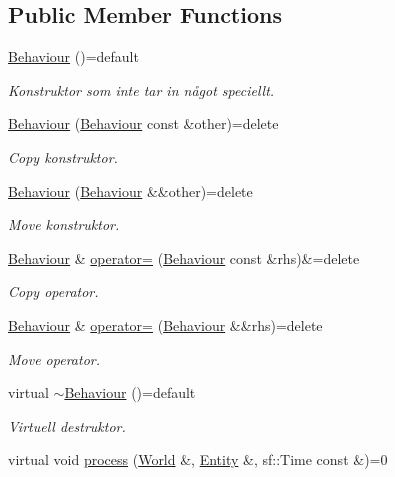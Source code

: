 \subsection*{Public Member Functions}
\begin{DoxyCompactItemize}
\item 
\hyperlink{classBehaviour_a57e050961bc1305993adaeac62658657}{Behaviour} ()=default
\begin{DoxyCompactList}\small\item\em Konstruktor som inte tar in något speciellt. \end{DoxyCompactList}\item 
\hyperlink{classBehaviour_a0a4eeb61f67cc58c720a110ef9695a73}{Behaviour} (\hyperlink{classBehaviour}{Behaviour} const \&other)=delete
\begin{DoxyCompactList}\small\item\em Copy konstruktor. \end{DoxyCompactList}\item 
\hyperlink{classBehaviour_ae157e7d158e19b515eaac6ef3b37ef0a}{Behaviour} (\hyperlink{classBehaviour}{Behaviour} \&\&other)=delete
\begin{DoxyCompactList}\small\item\em Move konstruktor. \end{DoxyCompactList}\item 
\hyperlink{classBehaviour}{Behaviour} \& \hyperlink{classBehaviour_a3c0ca3a4544e6c126ddaf662538b2e48}{operator=} (\hyperlink{classBehaviour}{Behaviour} const \&rhs)\&=delete
\begin{DoxyCompactList}\small\item\em Copy operator. \end{DoxyCompactList}\item 
\hyperlink{classBehaviour}{Behaviour} \& \hyperlink{classBehaviour_a1bfe3e24e2776f887cf67863630e4154}{operator=} (\hyperlink{classBehaviour}{Behaviour} \&\&rhs)=delete
\begin{DoxyCompactList}\small\item\em Move operator. \end{DoxyCompactList}\item 
virtual \hyperlink{classBehaviour_a3c695554c881998c9ef87cb407b4e451}{$\sim$\+Behaviour} ()=default
\begin{DoxyCompactList}\small\item\em Virtuell destruktor. \end{DoxyCompactList}\item 
virtual void \hyperlink{classBehaviour_aaa6b4ee24dc3cc546fa4dbb7ba4d20da}{process} (\hyperlink{classWorld}{World} \&, \hyperlink{classEntity}{Entity} \&, sf\+::\+Time const \&)=0
\end{DoxyCompactItemize}
